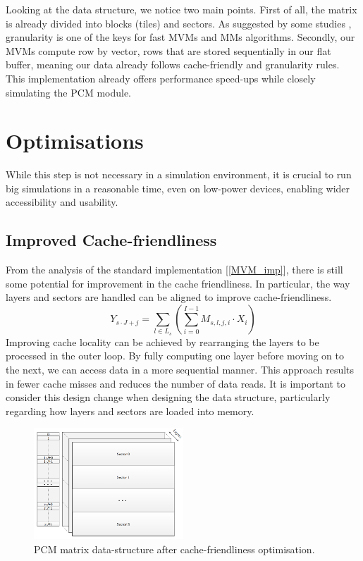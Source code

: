 Looking at the data structure, we notice two main points. 
First of all, the matrix is already divided into blocks (tiles) and sectors.
As suggested by some studies \cite{yajnaseni_survey_2015}, granularity is one of the keys for fast MVMs and MMs algorithms.
Secondly, our MVMs compute row by vector, rows that are stored sequentially in our flat buffer, meaning our data already follows cache-friendly and granularity rules.
This implementation already offers performance speed-ups while closely simulating the PCM module.

\section{Optimisations}\label{sec:optim}
While this step is not necessary in a simulation environment, it is crucial to run big simulations in a reasonable time, even on low-power devices, enabling wider accessibility and usability.

\subsection{Improved Cache-friendliness}\label{sec:cache_friendly}
From the analysis of the standard implementation [\ref{MVM_imp}], there is still some potential for improvement in the cache friendliness.
In particular, the way layers and sectors are handled can be aligned to improve cache-friendliness.
\begin{equation}
    Y_{s\cdot J + j}=\sum_{l\in L_s}(\sum_{i=0}^{I-1} M_{s,l,j,i}\cdot X_i)
    \label{MVM_op}
\end{equation}
Improving cache locality can be achieved by rearranging the layers to be processed in the outer loop. By fully computing one layer before moving on to the next, we can access data in a more sequential manner. This approach results in fewer cache misses and reduces the number of data reads. 
It is important to consider this design change when designing the data structure, particularly regarding how layers and sectors are loaded into memory.
\begin{figure}
    \centering
    \includegraphics[width=0.5\textwidth]{Figures/pcm_cache_friendly.png}
    \caption{PCM matrix data-structure after cache-friendliness optimisation.}
    \label{fig:pcm_cache_friendly}
\end{figure}

